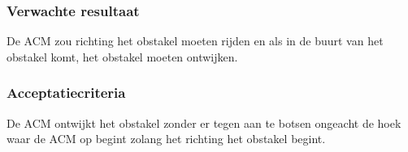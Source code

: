 \subsubsection{Verwachte resultaat}
\begin{flushleft}
    De ACM zou richting het obstakel moeten rijden en als in de buurt van het obstakel komt, het obstakel moeten ontwijken.
\end{flushleft}
\subsubsection{Acceptatiecriteria}
\begin{flushleft}
    De ACM ontwijkt het obstakel zonder er tegen aan te botsen ongeacht de hoek waar de ACM op begint zolang het richting het obstakel begint.
\end{flushleft}